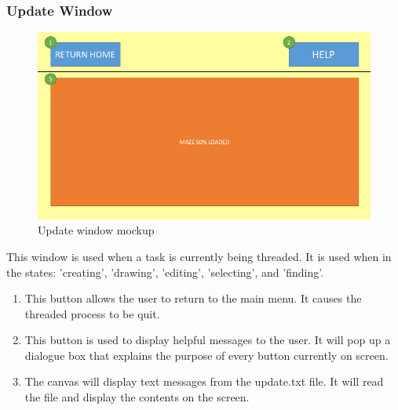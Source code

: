 \documentclass[titlepage]{article}
\begin{document}
\subsubsection{Update Window}
\begin{figure}[H]
  \centering
  \includegraphics[width=12cm]{Slide2.png}
  \caption{Update window mockup}
  \label{fig:dijk}
\end{figure}
This window is used when a task is currently being threaded. It is used when in the states: 'creating', 'drawing', 'editing', 'selecting', and 'finding'.
\begin{enumerate}
\item This button allows the user to return to the main menu. It causes the threaded process to be quit.
\item This button is used to display helpful messages to the user. It will pop up a dialogue box that explains the purpose of every button currently on screen.
\item The canvas will display text messages from the update.txt file. It will read the file and display the contents on the screen. 
\end{enumerate}
\end{document}
